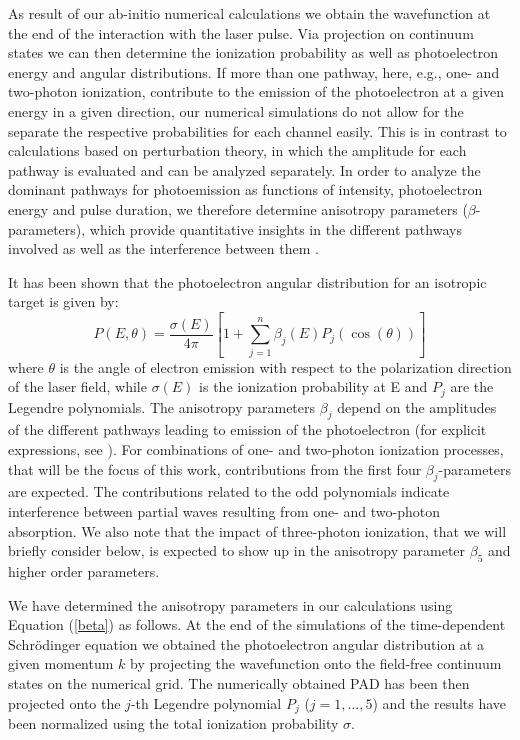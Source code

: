 As result of our ab-initio numerical calculations we obtain the wavefunction at the end of the interaction with the laser pulse. Via projection on continuum states we can then determine the ionization probability as well as photoelectron energy and angular distributions. If more than one pathway, here, e.g., one- and two-photon ionization, contribute to the emission of the photoelectron at a given energy in a given direction, our numerical simulations do not allow for the separate the respective probabilities for each channel easily. This is in contrast to calculations based on perturbation theory, in which the amplitude for each pathway is evaluated and can be analyzed separately. In order to analyze the dominant pathways for photoemission as functions of intensity, photoelectron energy and pulse duration, we therefore determine anisotropy parameters ($\beta$-parameters), which provide quantitative insights in the different pathways involved as well as the interference between them \cite{grum-grzhimailo2015,douguet2016,boll2019}.

It has been shown \cite{laplanche1986} that the photoelectron angular distribution for an isotropic target is given by: 
%
\begin{equation}
\label{beta}
    P(E,\theta) = \frac{\sigma(E)}{4\pi} \left[ 1 + \sum\limits_{j=1}^{n} \beta_j(E) P_j(\cos(\theta)) \right]
\end{equation}
%
where $\theta$ is the angle of electron emission with respect to the polarization direction of the laser field, while $\sigma(E)$ is the ionization probability at E and $P_j$ are the Legendre polynomials. The anisotropy parameters $\beta_j$ depend on the amplitudes of the different pathways leading to emission of the photoelectron (for explicit expressions, see  \cite{grum-grzhimailo2015}). For combinations of one- and two-photon ionization processes, that will be the focus of this work, contributions from the first four $\beta_j$-parameters are expected. The contributions related to the odd polynomials indicate interference between partial waves resulting from one- and two-photon absorption. We also note that the impact of three-photon ionization, that we will briefly consider below, is expected to show up in the anisotropy parameter $\beta_5$ and higher order parameters.

We have determined the anisotropy parameters in our calculations using Equation (\ref{beta}) as follows. At the end of the simulations of the time-dependent Schr\"odinger equation we obtained the photoelectron angular distribution at a given momentum $k$ by projecting the wavefunction onto the field-free continuum states on the numerical grid. The numerically obtained PAD has been then projected onto the $j$-th  Legendre polynomial $P_j$ ($j = 1, \ldots, 5$) and the results have been normalized using the total ionization probability $\sigma$.  

